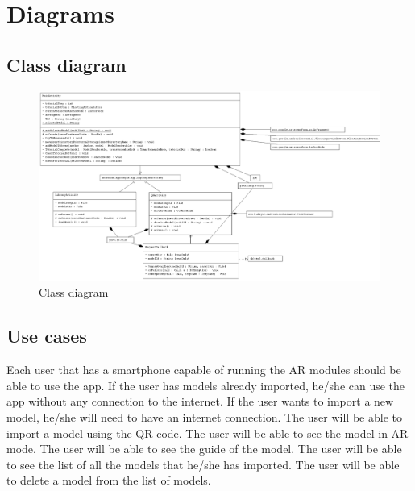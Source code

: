 \clearpage

\section{Diagrams}
\subsection*{Class diagram}

\begin{figure}[ht]
    \centering
    \includegraphics[width=1\textwidth]{img/ClassDiagram.png}
    \caption{Class diagram}
    \label{fig:ClassDiagram}
\end{figure}


\subsection*{Use cases}
Each user that has a smartphone capable of running the AR modules should be able to use the app. If the user has models already imported, he/she can use the app without any connection to the internet. If the user wants to import a new model, he/she will need to have an internet connection. The user will be able to import a model using the QR code. The user will be able to see the model in AR mode. The user will be able to see the guide of the model. The user will be able to see the list of all the models that he/she has imported. The user will be able to delete a model from the list of models.

